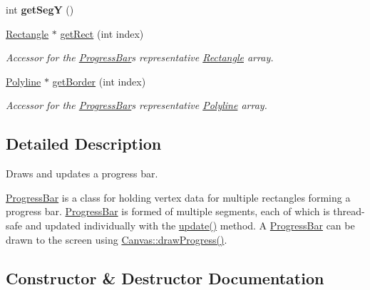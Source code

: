 \begin{DoxyCompactItemize}
\item 
\hypertarget{classtsgl_1_1_progress_bar_a7efb6be08196ad2b48d4417a93d750ad}{}int {\bfseries get\+Seg\+Y} ()\label{classtsgl_1_1_progress_bar_a7efb6be08196ad2b48d4417a93d750ad}

\item 
\hyperlink{classtsgl_1_1_rectangle}{Rectangle} $\ast$ \hyperlink{classtsgl_1_1_progress_bar_aa360099f70e0c33c99f349cf28cbe610}{get\+Rect} (int index)
\begin{DoxyCompactList}\small\item\em Accessor for the \hyperlink{classtsgl_1_1_progress_bar}{Progress\+Bar}\textquotesingle{}s representative \hyperlink{classtsgl_1_1_rectangle}{Rectangle} array. \end{DoxyCompactList}\item 
\hyperlink{classtsgl_1_1_polyline}{Polyline} $\ast$ \hyperlink{classtsgl_1_1_progress_bar_ac2b51bdb0d19afaa03d60a9928fc873f}{get\+Border} (int index)
\begin{DoxyCompactList}\small\item\em Accessor for the \hyperlink{classtsgl_1_1_progress_bar}{Progress\+Bar}\textquotesingle{}s representative \hyperlink{classtsgl_1_1_polyline}{Polyline} array. \end{DoxyCompactList}\end{DoxyCompactItemize}


\subsection{Detailed Description}
Draws and updates a progress bar. 

\hyperlink{classtsgl_1_1_progress_bar}{Progress\+Bar} is a class for holding vertex data for multiple rectangles forming a progress bar. \hyperlink{classtsgl_1_1_progress_bar}{Progress\+Bar} is formed of multiple segments, each of which is thread-\/safe and updated individually with the \hyperlink{classtsgl_1_1_progress_bar_a4274998e4935f33eb9212b2174d9c0c5}{update()} method. A \hyperlink{classtsgl_1_1_progress_bar}{Progress\+Bar} can be drawn to the screen using \hyperlink{classtsgl_1_1_canvas_aea792059486ebe6d25d7f81bdadf751d}{Canvas\+::draw\+Progress()}. 

\subsection{Constructor \& Destructor Documentation}
\hypertarget{classtsgl_1_1_progress_bar_ac79018d09a75c490de3490306146c010}{}
